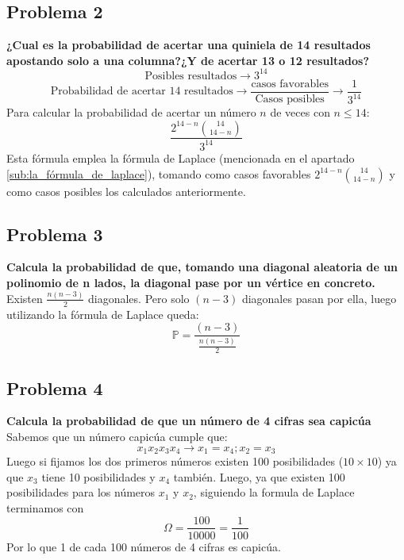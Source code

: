 \documentclass[11pt]{article}
\newcommand{\prob}{\mathbb{P}}
\newcommand{\OMG}{\varOmega}
\theoremstyle{plain}
\begin{document}
        \subsection{Problema 2} %
        \label{sub:problema_2}
            \textbf{¿Cual es la probabilidad de acertar una quiniela de 14 resultados apostando solo a una columna?¿Y de acertar 13 o 12 resultados?}
            \[\text{Posibles resultados}\rightarrow3^{14}\]
            \[\text{Probabilidad de acertar 14 resultados} \rightarrow \frac{\text{casos favorables}}{\text{Casos posibles}} \rightarrow \frac{1}{3^{14}}\]
            Para calcular la probabilidad de acertar un número $n$ de veces con $n\le14$:
            \begin{equation}
                \frac{2^{14-n} \binom{14}{14-{}n}}{3^{14}}
            \end{equation}
            Esta fórmula emplea la fórmula de Laplace (mencionada en el apartado \ref{sub:la_fórmula_de_laplace}), tomando como casos favorables $2^{14-n} \binom{14}{14-n}$ y como casos posibles los calculados anteriormente.
        \subsection{Problema 3} %
        \label{sub:problema_3}
            \textbf{Calcula la probabilidad de que, tomando una diagonal aleatoria de un polinomio de n lados, la diagonal pase por un vértice en concreto.}\\

            Existen $\frac{n(n-3)}{2}$ diagonales. Pero solo $(n-3)$ diagonales pasan por ella, luego utilizando la fórmula de Laplace queda:\[\prob = \frac{(n-3)}{\frac{n(n-3)}{2}}\]
        \subsection{Problema 4} %
        \label{sub:problema_4}
            \textbf{Calcula la probabilidad de que un número de 4 cifras sea capicúa}\\
            Sabemos que un número capicúa cumple que: \[x_1x_2x_3x_4 \rightarrow x_1 = x_4 ; x_2 = x_3\] Luego si fijamos los dos primeros números existen 100 posibilidades ($10 \times 10$) ya que $x_3$ tiene 10 posibilidades y $x_4$ también. Luego, ya que existen 100 posibilidades para los números $x_1$ y $x_2$, siguiendo la formula de Laplace terminamos con \[\OMG = \frac{100}{10000} = \frac{1}{100}\]
            Por lo que 1 de cada 100 números de 4 cifras es capicúa.
\end{document}
